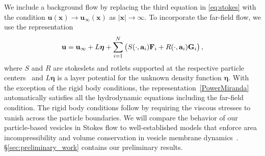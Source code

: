 We include a background flow by replacing the third equation in
\eqref{eq:stokes} with the condition $\mathbf{u}(\mathbf{x})
\to \mathbf{u}_{\infty}(\mathbf{x})$ as $|\mathbf{x}| \to
\infty$. To incorporate the far-field flow, we use the representation 
\begin{align}
\label{PowerMiranda}
  {\bf u} = {\bf u}_{\infty} + L\boldsymbol{\eta} + 
    \sum_{i=1}^N \left(S(\cdot, {\bf a}_i) {\bf F}_i + 
                 R(\cdot, {\bf a}_i) {\bf G}_i\right),
\end{align}
where $S$ and $R$ are stokeslets and rotlets supported at the respective
particle centers~\cite{leal_2007} and $L\boldsymbol{\eta}$ is a layer
potential for the unknown density function $\boldsymbol{\eta}$. With the
exception of the rigid body conditions, the
representation~\eqref{PowerMiranda} automatically satisfies all the
hydrodynamic equations including the far-field condition. The rigid
body conditions follow by requiring the viscous stresses to vanish across
the particle boundaries.
%
We will compare the behavior of our particle-based vesicles in Stokes
flow to well-established models that enforce area incompressibility and
volume conservation in vesicle membrane
dynamics~\cite{torres-sanchez_millan_arroyo_2019,mahapatra_saintillan_rangamani_2020, Steigmann99, C6SM02452A}.
\S \ref{sec:preliminary_work} contains our preliminary results.
%
%
%


